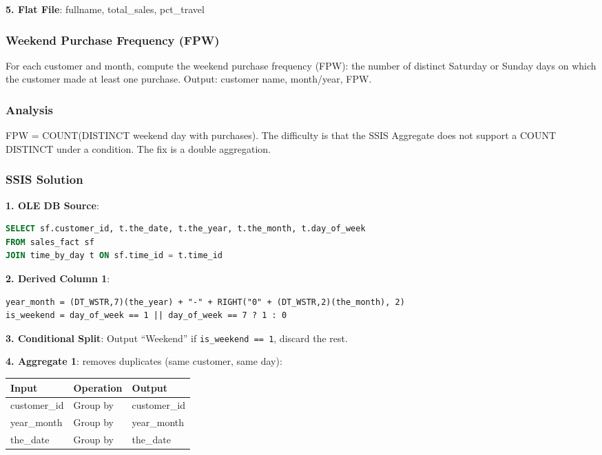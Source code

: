 \textbf{5. Flat File}: fullname, total\_sales, pct\_travel

\subsubsection{Weekend Purchase Frequency (FPW)}
\label{subsec:ex-fpw}

\begin{theorybox}[frametitle={Exercise}]
For each customer and month, compute the weekend purchase frequency (FPW): the number of distinct Saturday or Sunday days on which the customer made at least one purchase. Output: customer name, month/year, FPW.
\end{theorybox}

\subsubsection*{Analysis}

FPW = COUNT(DISTINCT weekend day with purchases). The difficulty is that the SSIS Aggregate does not support a COUNT DISTINCT under a condition. The fix is a double aggregation.

\subsubsection*{SSIS Solution}

\textbf{1. OLE DB Source}:
\begin{lstlisting}[language=SQL]
SELECT sf.customer_id, t.the_date, t.the_year, t.the_month, t.day_of_week
FROM sales_fact sf
JOIN time_by_day t ON sf.time_id = t.time_id
\end{lstlisting}

\textbf{2. Derived Column 1}:
\begin{lstlisting}
year_month = (DT_WSTR,7)(the_year) + "-" + RIGHT("0" + (DT_WSTR,2)(the_month), 2)
is_weekend = day_of_week == 1 || day_of_week == 7 ? 1 : 0
\end{lstlisting}

\textbf{3. Conditional Split}: Output ``Weekend'' if \texttt{is\_weekend == 1}, discard the rest.

\textbf{4. Aggregate 1}: removes duplicates (same customer, same day):
\begin{center}
\scriptsize
\begin{tabular}{@{}lll@{}}
\toprule
\textbf{Input} & \textbf{Operation} & \textbf{Output} \\
\midrule
customer\_id & Group by & customer\_id \\
year\_month & Group by & year\_month \\
the\_date & Group by & the\_date \\
\bottomrule
\end{tabular}
\end{center}

